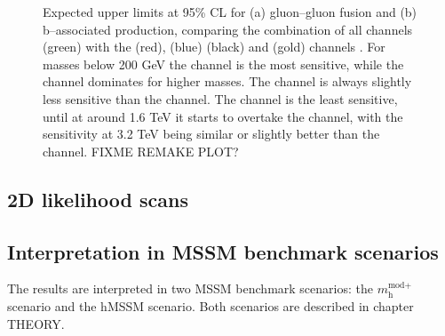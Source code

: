 \begin{figure}[h!]
\begin{center}
\end{center}
\caption{Expected upper limits at 95\% CL for (a) gluon--gluon fusion and (b) b--associated production,
comparing the combination of all channels (green) with the \mutau (red), \etau (blue) \tautau (black)
and \emu (gold) channels \cite{CMS-PAS-HIG-16-037}. For masses below 200 GeV the \mutau channel is the most sensitive,
while the \tautau channel dominates for higher masses. The \etau channel is always
slightly less sensitive than the \mutau channel. The \emu channel is the least sensitive, 
until at around 1.6 TeV it starts to overtake the \etau channel, with the sensitivity at 3.2 TeV 
being similar or slightly better than the \mutau channel. FIXME REMAKE PLOT?}
\label{fig:mssm_results_limits_breakdown}
\end{figure}

\subsection{2D likelihood scans}
\label{sec:mssm_results_2D}

\subsection{Interpretation in MSSM benchmark scenarios}
\label{sec:mssm_results_modeldep}
The results are interpreted in two MSSM benchmark scenarios: the $m_{\text{h}}^{\text{mod+}}$
scenario and the hMSSM scenario. Both scenarios are described in chapter THEORY.

